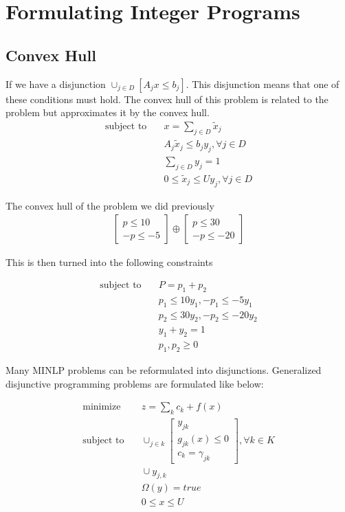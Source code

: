 \section{Formulating Integer Programs}

\subsection{Convex Hull}

If we have a disjunction $\cup_{j \in D}[A_j x \leq b_j]$.
This disjunction means that one of these conditions must hold.
The convex hull of this problem is related to the problem but approximates it by the convex hull.
\begin{align}
  \text{subject to} & \quad x = \sum_{j \in D} \tilde{x}_j \\
  & \quad A_j \tilde{x}_j  \leq b_j y_j, \forall j \in D \\
  & \quad \sum_{j \in D} y_j = 1 \\
  & \quad 0 \leq \tilde{x}_j \leq U y_j, \forall j \in D
\end{align}

The convex hull of the problem we did previously
\begin{align}
  \begin{bmatrix}
     p \leq 10 \\
     -p \leq -5
  \end{bmatrix}
  \oplus
  \begin{bmatrix}
    p \leq 30 \\
    -p \leq -20
  \end{bmatrix}
\end{align}

This is then turned into the following constraints

\begin{align}
  \text{subject to} & \quad P = p_1 + p_2 \\
  & \quad p_1 \leq 10 y_1, -p_1 \leq -5 y_1 \\
  & \quad p_2 \leq 30 y_2, -p_2 \leq -20 y_2 \\
  & \quad y_1 + y_2 = 1 \\
  & \quad p_1, p_2 \geq 0
\end{align}

Many MINLP problems can be reformulated into disjunctions.
Generalized disjunctive programming problems are formulated like below:

\begin{align}
  \text{minimize} & \quad z = \sum_k c_k + f(x) \\
  \text{subject to} & \quad 
  \cup_{j \in k}
  \begin{bmatrix}
    y_{jk} \\ g_{jk}(x) \leq 0 \\ c_k = \gamma_{jk}
  \end{bmatrix}
  , \forall k \in K
  \\
  & \quad \cup y_{j,k} \\
  & \quad \Omega(y) = true \\
  & \quad 0 \leq x \leq U
\end{align}

